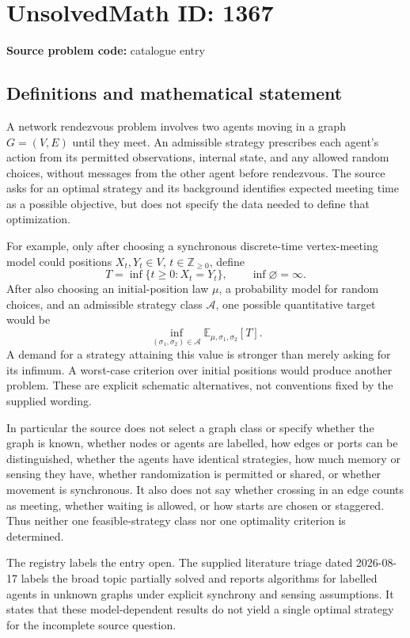\documentclass[11pt]{article}
\newcommand{\Z}{\mathbb{Z}}
\newcommand{\E}{\mathbb{E}}
\begin{document}
\section*{UnsolvedMath ID: 1367}
\textbf{Source problem code:} catalogue entry
\subsection{Definitions and mathematical statement}
A network rendezvous problem involves two agents moving in a graph \(G=(V,E)\) until they meet. An admissible strategy prescribes each agent's action from its permitted observations, internal state, and any allowed random choices, without messages from the other agent before rendezvous. The source asks for an optimal strategy and its background identifies expected meeting time as a possible objective, but does not specify the data needed to define that optimization.

For example, only after choosing a synchronous discrete-time vertex-meeting model could positions \(X_t,Y_t\in V\), \(t\in\Z_{\geq0}\), define
\[
T=\inf\{t\geq0:X_t=Y_t\},\qquad \inf\varnothing=\infty.
\]
After also choosing an initial-position law \(\mu\), a probability model for random choices, and an admissible strategy class \(\mathcal A\), one possible quantitative target would be
\[
\inf_{(\sigma_1,\sigma_2)\in\mathcal A}\E_{\mu,\sigma_1,\sigma_2}[T].
\]
A demand for a strategy attaining this value is stronger than merely asking for its infimum. A worst-case criterion over initial positions would produce another problem. These are explicit schematic alternatives, not conventions fixed by the supplied wording.

In particular the source does not select a graph class or specify whether the graph is known, whether nodes or agents are labelled, how edges or ports can be distinguished, whether the agents have identical strategies, how much memory or sensing they have, whether randomization is permitted or shared, or whether movement is synchronous. It also does not say whether crossing in an edge counts as meeting, whether waiting is allowed, or how starts are chosen or staggered. Thus neither one feasible-strategy class nor one optimality criterion is determined.

The registry labels the entry open. The supplied literature triage dated 2026-08-17 labels the broad topic partially solved and reports algorithms for labelled agents in unknown graphs under explicit synchrony and sensing assumptions. It states that these model-dependent results do not yield a single optimal strategy for the incomplete source question.
\end{document}
